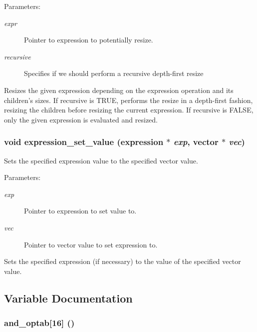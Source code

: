 \begin{Desc}
\item[Parameters:]
\begin{description}
\item[{\em expr}]Pointer to expression to potentially resize. \item[{\em recursive}]Specifies if we should perform a recursive depth-first resize\end{description}
\end{Desc}
Resizes the given expression depending on the expression operation and its children's sizes. If recursive is TRUE, performs the resize in a depth-first fashion, resizing the children before resizing the current expression. If recursive is FALSE, only the given expression is evaluated and resized. 
\subsubsection{\setlength{\rightskip}{0pt plus 5cm}void expression\_\-set\_\-value ({\bf expression} $\ast$ {\em exp}, {\bf vector} $\ast$ {\em vec})}\label{expr_8c_a12}


Sets the specified expression value to the specified vector value. 

\begin{Desc}
\item[Parameters:]
\begin{description}
\item[{\em exp}]Pointer to expression to set value to. \item[{\em vec}]Pointer to vector value to set expression to.\end{description}
\end{Desc}
Sets the specified expression (if necessary) to the value of the specified vector value. 

\subsection{Variable Documentation}
\subsubsection{ {\bf and\_\-optab}[16] ()}\label{expr_8c_a1}


